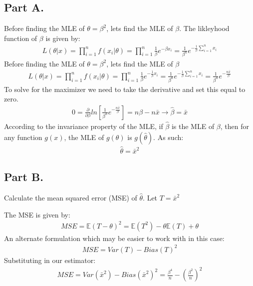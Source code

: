 \documentclass{article}
\begin{document}
\subsection*{Part A.}
Before finding the MLE of $\theta=\beta^2$, lets find the MLE of $\beta$. The likleyhood function of $\beta$ is given by:
\begin{align*}
L(\theta|x) = \prod_{i=1}^{n} f(x_i|\theta) = \prod_{i=1}^{n} \frac{1}{\beta} e^{-\beta x_i} = \frac{1}{\beta^n} e^{- \frac{1}{\beta} \sum_{i=1}^{n} x_i}
\end{align*}
Before finding the MLE of $\theta=\beta^2$, lets find the MLE of $\beta$
\begin{align*}
L(\theta|x) = \prod_{i=1}^{n} f(x_i|\theta) = \prod_{i=1}^{n} \frac{1}{\beta} e^{-\frac{1}{\beta} x_i} = \frac{1}{\beta^n} e^{- \frac{1}{\beta} \sum_{i=1}^{n} x_i} = \frac{1}{\beta^n} e^{- \frac{n \bar{x}}{\beta}}
\end{align*}
To solve for the maximizer we need to take the derivative and set this equal to zero.
\begin{align*}
0 = \frac{\partial}{\partial \beta} ln[\frac{1}{\beta^n} e^{- \frac{n \bar{x}}{\beta}}] = n\beta - n \bar{x} \rightarrow \hat{\beta} = \bar{x}
\end{align*}
According to the invariance property of the MLE, if $\hat{ \beta }$ is the MLE of $\beta$, then for any function $g(x)$, the MLE of $g(\theta)$ is $g(\hat{\theta})$. As such:
\begin{align*}
\boxed{ \hat{\theta} = \bar{x}^2 }
\end{align*}
\subsection*{Part B.}
Calculate the mean squared error (MSE) of $\hat{\theta}$. Let $T={\bar{x}^2}$ 

The MSE is given by:
\begin{align*}
MSE = \mathbb{E}(T-\theta)^2 = \mathbb{E}(T^2) - \theta \mathbb{E}(T) + \theta
\end{align*}
An alternate formulation which may be easier to work with in this case:
\begin{align*}
MSE = Var(T) - Bias(T)^2
\end{align*}
Substituting in our estimator:
\begin{align*}
\boxed{ MSE = Var(\bar{x}^2) - Bias(\bar{x}^2)^2 = \frac{\beta^4}{n} - (\frac{\beta^2}{n})^2 }
\end{align*}
\end{document}
